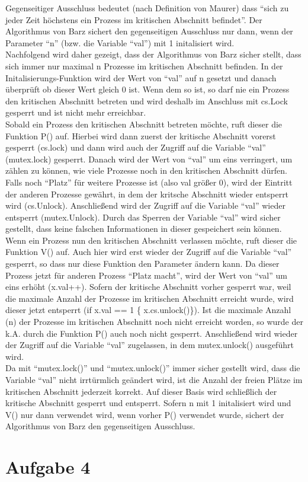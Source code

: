 \documentclass[11pt,a4paper,DIV=10,]{scrartcl}
\begin{document}
Gegenseitiger Ausschluss bedeutet (nach Definition von Maurer) dass ``sich zu jeder Zeit höchstens ein Prozess im kritischen Abschnitt befindet''. 
Der Algorithmus von Barz sichert den gegenseitigen Ausschluss nur dann, wenn der Parameter ``n'' (bzw. die Variable ``val'') mit 1 initalisiert wird. \\
Nachfolgend wird daher gezeigt, dass der Algorithmus von Barz sicher stellt, dass sich immer nur maximal n Prozesse im kritischen Abschnitt befinden. 
In der Initalisierungs-Funktion wird der Wert von ``val'' auf n gesetzt und danach überprüft ob dieser Wert gleich 0 ist. Wenn dem so ist, so darf nie ein Prozess den kritischen Abschnitt betreten und wird deshalb im Anschluss mit cs.Lock gesperrt und ist nicht mehr erreichbar. \\
Sobald ein Prozess den kritischen Abschnitt betreten möchte, ruft dieser die Funktion P() auf. Hierbei wird dann zuerst der kritische Abschnitt vorerst gesperrt (cs.lock) und dann wird auch der Zugriff auf die Variable ``val'' (mutex.lock) gesperrt. Danach wird der Wert von ``val'' um eins verringert, um zählen zu können, wie viele Prozesse noch in den kritischen Abschnitt dürfen. Falls noch ``Platz'' für weitere Prozesse ist (also val größer 0), wird der Eintritt der anderen Prozesse gewährt, in dem der kritsche Abschnitt wieder entsperrt wird (cs.Unlock). Anschließend wird der Zugriff auf die Variable ``val'' wieder entsperrt (mutex.Unlock). Durch das Sperren der Variable ``val'' wird sicher gestellt, dass keine falschen Informationen in dieser gespeichert sein können. \\
Wenn ein Prozess nun den kritischen Abschnitt verlassen möchte, ruft dieser die Funktion V() auf. Auch hier wird erst  wieder der Zugriff auf die Variable ``val'' gesperrt, so dass nur diese Funktion den Parameter ändern kann. Da dieser Prozess jetzt für anderen Prozess ``Platz macht'', wird der Wert von ``val'' um eins erhöht (x.val++). Sofern der kritische Abschnitt vorher gesperrt war, weil die maximale Anzahl der Prozesse im kritischen Abschnitt erreicht wurde, wird dieser jetzt entsperrt (if x.val == 1  \{ x.cs.unlock()\}). Ist die maximale Anzahl (n) der Prozesse im kritischen Abschnitt noch nicht erreicht worden, so wurde der k.A. durch die Funktion P() auch noch nicht gesperrt. Anschließend wird wieder der Zugriff auf die Variable ``val'' zugelassen, in dem mutex.unlock() ausgeführt wird. \\
Da mit ``mutex.lock()'' und ``mutex.unlock()'' immer sicher gestellt wird, dass die Variable ``val'' nicht irrtürmlich geändert wird, ist die Anzahl der freien Plätze im kritischen Abschnitt jederzeit korrekt. Auf dieser Basis wird schließlich der kritische Abschnitt gesperrt und entsperrt. Sofern n mit 1 initalisiert wird und V() nur dann verwendet wird, wenn vorher P() verwendet wurde, sichert der Algorithmus von Barz den gegenseitigen Ausschluss. 





\section*{Aufgabe 4}




\end{document}
